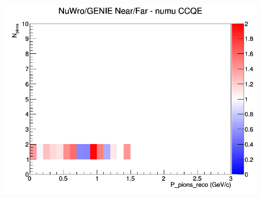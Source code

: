 \documentclass[12pt]{article}
\begin{document}
\begin{figure}[h]
\endminipage
{}
\includegraphics[width=\linewidth]{eff_N_P/FGT/pions/ratios/CCQE_NuWro_GENIE_numu_NF_N_P.png}
\endminipage
\newline
\end{figure}
\clearpage
\end{document}
